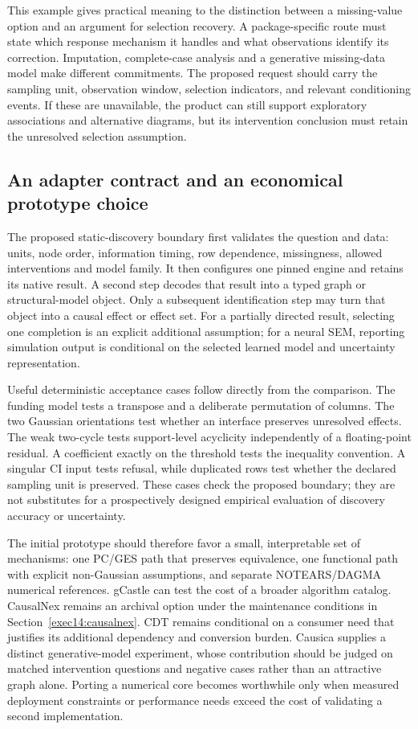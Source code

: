This example gives practical meaning to the distinction between a missing-value
option and an argument for selection recovery. A package-specific route must
state which response mechanism it handles and what observations identify its
correction. Imputation, complete-case analysis and a generative missing-data
model make different commitments. The proposed request should carry the
sampling unit, observation window, selection indicators, and relevant
conditioning events. If these are unavailable, the product can still support
exploratory associations and alternative diagrams, but its intervention
conclusion must retain the unresolved selection assumption.

\subsection{An adapter contract and an economical prototype choice}

The proposed static-discovery boundary first validates the question and data:
units, node order, information timing, row dependence, missingness, allowed
interventions and model family. It then configures one pinned engine and
retains its native result. A second step decodes that result into a typed graph
or structural-model object. Only a subsequent identification step may turn
that object into a causal effect or effect set. For a partially directed
result, selecting one completion is an explicit additional assumption; for a
neural SEM, reporting simulation output is conditional on the selected learned
model and uncertainty representation.

Useful deterministic acceptance cases follow directly from the comparison.
The funding model tests a transpose and a deliberate permutation of columns.
The two Gaussian orientations test whether an interface preserves unresolved
effects. The weak two-cycle tests support-level acyclicity independently of a
floating-point residual. A coefficient exactly on the threshold tests the
inequality convention. A singular CI input tests refusal, while duplicated
rows test whether the declared sampling unit is preserved. These cases check
the proposed boundary; they are not substitutes for a prospectively designed
empirical evaluation of discovery accuracy or uncertainty.

The initial prototype should therefore favor a small, interpretable set of
mechanisms: one PC/GES path that preserves equivalence, one functional path
with explicit non-Gaussian assumptions, and separate NOTEARS/DAGMA numerical
references. gCastle can test the cost of a broader algorithm catalog.
CausalNex remains an archival option under the maintenance conditions in
Section~\ref{exec14:causalnex}. CDT remains conditional on a consumer need
that justifies its additional dependency and conversion burden. Causica supplies a distinct
generative-model experiment, whose contribution should be judged on matched
intervention questions and negative cases rather than an attractive graph
alone. Porting a numerical core becomes worthwhile only when measured
deployment constraints or performance needs exceed the cost of validating a
second implementation.


